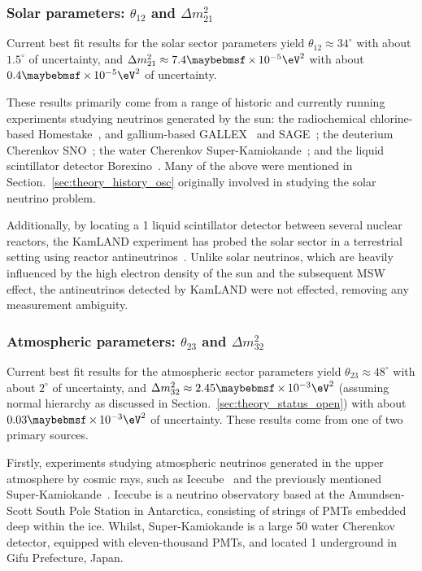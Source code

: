 \subsubsection*{Solar parameters: $\theta_{12}$ and $\Delta m^{2}_{21}$} %

Current best fit results for the solar sector parameters yield $\theta_{12}\approx34^{\circ}$ with
about $1.5^{\circ}$ of uncertainty, and $\Delta m^{2}_{21}\approx7.4\times10^{-5}\eV^{2}$ with
about $0.4\times10^{-5}\eV^{2}$ of uncertainty.

These results primarily come from a range of historic and currently running experiments studying
neutrinos generated by the sun: the radiochemical chlorine-based Homestake~\cite{cleveland1998},
and gallium-based GALLEX~\cite{kaether2010} and SAGE~\cite{abdurashitov2009}; the deuterium
Cherenkov SNO~\cite{maneira2011}; the water Cherenkov Super-Kamiokande~\cite{hosaka2006,
    cravens2008, abe2011_super, nakano2017}; and the liquid scintillator detector
Borexino~\cite{bellini2011, Bellini2010, bellini2014}. Many of the above were mentioned in
Section.~\ref{sec:theory_history_osc} originally involved in studying the solar neutrino problem.

Additionally, by locating a \unit{1}{} liquid scintillator detector between several
nuclear reactors, the KamLAND experiment has probed the solar sector in a terrestrial setting
using reactor antineutrinos~\cite{gando2011}. Unlike solar neutrinos, which are heavily influenced
by the high electron density of the sun and the subsequent MSW effect, the antineutrinos detected
by KamLAND were not effected, removing any measurement ambiguity.

\subsubsection*{Atmospheric parameters: $\theta_{23}$ and $\Delta m^{2}_{32}$} %

Current best fit results for the atmospheric sector parameters yield
$\theta_{23}\approx48^{\circ}$ with about $2^{\circ}$ of uncertainty, and $\Delta
    m^{2}_{32}\approx2.45\times10^{-3}\eV^{2}$ (assuming normal hierarchy as discussed in
Section.~\ref{sec:theory_status_open}) with about $0.03\times10^{-3}\eV^{2}$ of uncertainty. These
results come from one of two primary sources.

Firstly, experiments studying atmospheric neutrinos generated in the upper atmosphere by cosmic
rays, such as Icecube~\cite{karle2003, aartsen2015} and the previously mentioned
Super-Kamiokande~\cite{abe2018}. Icecube is a neutrino observatory based at the Amundsen-Scott
South Pole Station in Antarctica, consisting of strings of PMTs embedded deep within the ice.
Whilst, Super-Kamiokande is a large \unit{50}{} water Cherenkov detector, equipped with
eleven-thousand PMTs, and located \unit{1}{} underground in Gifu Prefecture, Japan.

